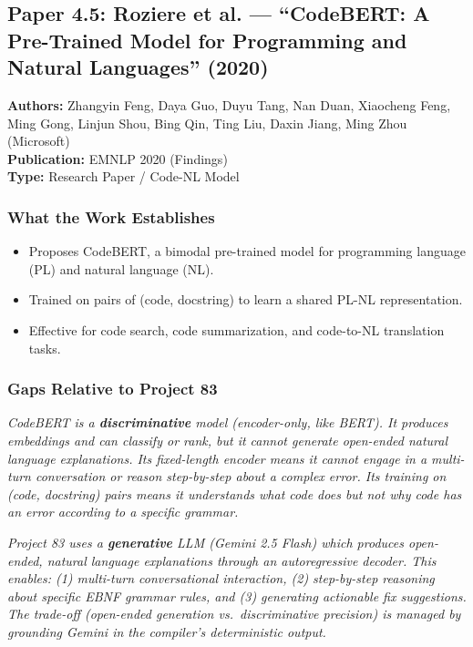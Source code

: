 \documentclass[a4paper,11pt]{article}
\newcommand{\papergap}[1]{%
  \begin{tcolorbox}[colback=red!5!white, colframe=red!60!black, title={Research Gap Identified}]
  \textit{#1}
  \end{tcolorbox}
}
\newcommand{\oursolution}[1]{%
  \begin{tcolorbox}[colback=green!5!white, colframe=green!60!black, title={How Project 83 Solves This Gap}]
  \textit{#1}
  \end{tcolorbox}
}
\begin{document}
\subsection{Paper 4.5: Roziere et al. --- ``CodeBERT: A Pre-Trained Model for Programming and Natural Languages'' (2020)}

\begin{tcolorbox}[colback=gray!5, colframe=gray!40]
\textbf{Authors:} Zhangyin Feng, Daya Guo, Duyu Tang, Nan Duan, Xiaocheng Feng, Ming Gong, Linjun Shou, Bing Qin, Ting Liu, Daxin Jiang, Ming Zhou (Microsoft) \\
\textbf{Publication:} EMNLP 2020 (Findings) \\
\textbf{Type:} Research Paper / Code-NL Model
\end{tcolorbox}

\subsubsection{What the Work Establishes}

\begin{itemize}
    \item Proposes CodeBERT, a bimodal pre-trained model for programming language (PL) and natural language (NL).
    \item Trained on pairs of (code, docstring) to learn a shared PL-NL representation.
    \item Effective for code search, code summarization, and code-to-NL translation tasks.
\end{itemize}

\subsubsection{Gaps Relative to Project 83}

\papergap{CodeBERT is a \textbf{discriminative} model (encoder-only, like BERT). It produces embeddings and can classify or rank, but it cannot \textit{generate} open-ended natural language explanations. Its fixed-length encoder means it cannot engage in a multi-turn conversation or reason step-by-step about a complex error. Its training on (code, docstring) pairs means it understands \textit{what code does} but not \textit{why code has an error according to a specific grammar}.}

\oursolution{Project 83 uses a \textbf{generative} LLM (Gemini 2.5 Flash) which produces open-ended, natural language explanations through an autoregressive decoder. This enables: (1) multi-turn conversational interaction, (2) step-by-step reasoning about specific EBNF grammar rules, and (3) generating actionable fix suggestions. The trade-off (open-ended generation vs.\ discriminative precision) is managed by grounding Gemini in the compiler's deterministic output.}
\end{document}
